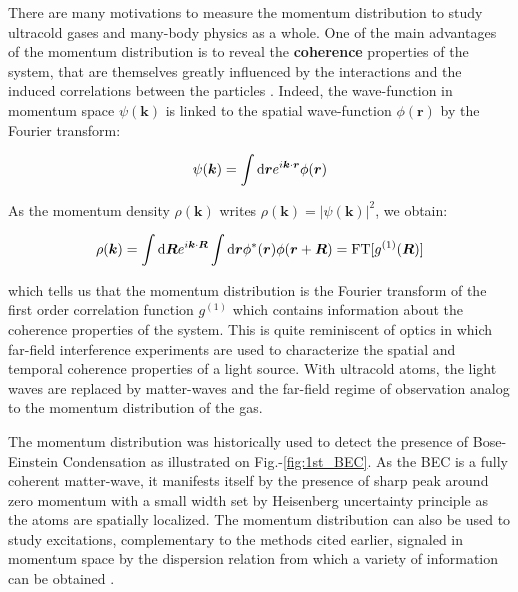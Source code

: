 
There are many motivations to measure the momentum distribution to study ultracold gases and many-body physics as a whole. One of the main advantages of the momentum distribution is to reveal the \textbf{coherence} properties of the system, that are themselves greatly influenced by the interactions and the induced correlations between the particles \cite{greiner2002quantum}. Indeed, the wave-function in momentum space $\psi(\bm{k})$ is linked to the spatial wave-function $\phi(\bm{r})$ by the Fourier transform:

\begin{equation}
    \psi(\bm{k}) = \int {\rm d}\bm{r} e^{i \bm{k} \cdot \bm{r}} \phi(\bm{r})
\end{equation}

\noindent As the momentum density $\rho(\bm{k})$ writes $\rho(\bm{k})= |\psi(\bm{k})|^2$, we obtain:

\begin{equation}
    \rho(\bm{k}) = \int {\rm d}\bm{R} e^{i \bm{k} \cdot \bm{R}} \int {\rm d}\bm{r} \phi^* (\bm{r}) \phi(\bm{r}+\bm{R}) = \text{FT} [g^{(1)} (\bm{R})]
\end{equation}

\noindent which tells us that the momentum distribution is the Fourier transform of the first order correlation function $g^{(1)}$ which contains information about the coherence properties of the system.
This is quite reminiscent of optics in which far-field interference experiments are used to characterize the spatial and temporal coherence properties of a light source. With ultracold atoms, the light waves are replaced by matter-waves and the far-field regime of observation analog to the momentum distribution of the gas.

The momentum distribution was historically \cite{anderson1995observation} used to detect the presence of Bose-Einstein Condensation as illustrated on Fig.-\ref{fig:1st_BEC}. As the BEC is a fully coherent matter-wave, it manifests itself by the presence of sharp peak around zero momentum with a small width set by Heisenberg uncertainty principle as the atoms are spatially localized. The momentum distribution can also be used to study excitations, complementary to the methods cited earlier, signaled in momentum space by the dispersion relation from which a variety of information can be obtained \cite{clement2009exploring,ozeri2005colloquium,sagi2012measurement}.


